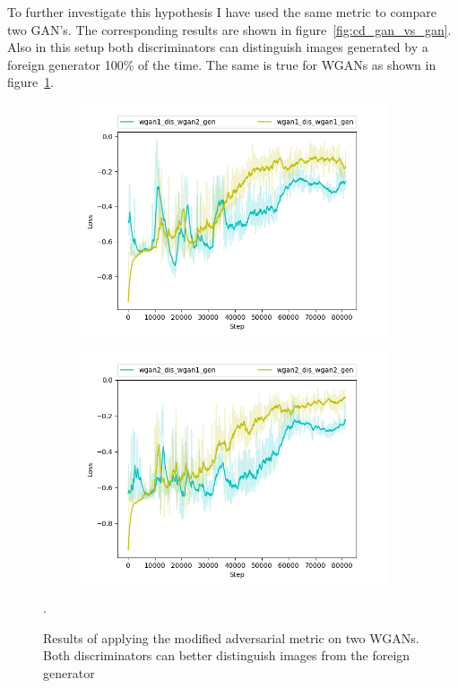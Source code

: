 To further investigate this hypothesis I have used the same metric to compare two GAN's. The corresponding results are shown in figure~\ref{fig:cd_gan_vs_gan}. Also in this setup both discriminators can distinguish images generated by a foreign generator 100\% of the time. The same is true for WGANs as shown in figure~\ref{fig:cd_wgan_vs_wgan}.
\begin{figure}[h]
	\begin{subfigure}[b]{0.5\textwidth}
		\includegraphics[width=\textwidth]{figures/wgan1_dis_wgan2_gen}
	\end{subfigure}
	\begin{subfigure}[b]{0.5\textwidth}
		\includegraphics[width=\textwidth]{figures/wgan2_dis_wgan1_gen}
	\end{subfigure}
	\caption{Results of applying the modified adversarial metric on two WGANs. Both discriminators can better distinguish images from the foreign generator}.
	\label{fig:cd_wgan_vs_wgan}
\end{figure}

